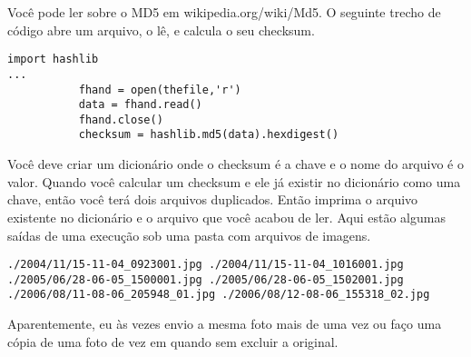 \begin{ex}
\begin{enumerate}
Você pode ler sobre o MD5 em wikipedia.org/wiki/Md5. O
seguinte trecho de código abre um arquivo, o lê, e calcula
o seu checksum.

\beforeverb
\begin{verbatim}
import hashlib 
...
           fhand = open(thefile,'r')
           data = fhand.read()
           fhand.close()
           checksum = hashlib.md5(data).hexdigest()
\end{verbatim}
\afterverb

Você deve criar um dicionário onde o checksum é a chave
e o nome do arquivo é o valor. Quando você calcular um checksum
e ele já existir no dicionário como uma chave, então você terá
dois arquivos duplicados. Então imprima o arquivo existente no dicionário
e o arquivo que você acabou de ler. Aqui estão algumas saídas
de uma execução sob uma pasta com arquivos de imagens.

\beforeverb
\begin{verbatim}
./2004/11/15-11-04_0923001.jpg ./2004/11/15-11-04_1016001.jpg
./2005/06/28-06-05_1500001.jpg ./2005/06/28-06-05_1502001.jpg
./2006/08/11-08-06_205948_01.jpg ./2006/08/12-08-06_155318_02.jpg
\end{verbatim}
\afterverb

Aparentemente, eu às vezes envio a mesma foto mais de uma vez
ou faço uma cópia de uma foto de vez em quando sem excluir
a original.

\end{enumerate}

\end{ex}